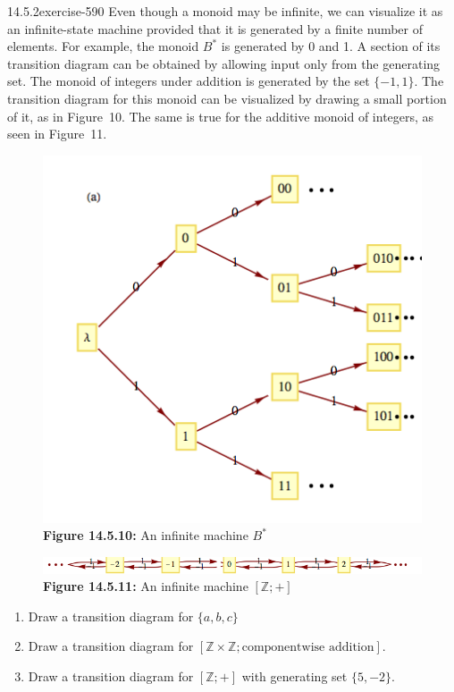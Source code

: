\documentclass[twoside,10pt,]{book}
\numberwithin{equation}{section}
\begin{document}
\begin{divisionsolution}{14.5.2}{}{exercise-590}%
\hypertarget{p-5285}{}%
Even though a monoid may be infinite, we can visualize it as an infinite-state machine provided that it is generated by a finite number of elements. For example, the monoid \(B^*\) is generated by 0 and 1. A section of its transition diagram can be obtained by allowing input only from the generating set. The monoid of integers under addition is generated by the set \(\{-1, 1\}\). The transition diagram for this monoid can be visualized by drawing a small portion of it, as in Figure~10. The same is true for the additive monoid of integers, as seen in Figure~11.%
\begin{figure}
\centering
\includegraphics[width=0.7\linewidth]{images/fig-exercise-14-5-2a.png}
\caption*{\textbf{Figure 14.5.10:} An infinite machine \(B^*\)}
\end{figure}
\begin{figure}
\centering
\includegraphics[width=0.7\linewidth]{images/fig-exercise-14-5-2b.png}
\caption*{\textbf{Figure 14.5.11:} An infinite machine \([\mathbb{Z};+]\)}
\end{figure}
\hypertarget{p-5286}{}%
\leavevmode%
\begin{enumerate}[label=(\alph*)]
\item\hypertarget{li-2391}{}\hypertarget{p-5287}{}%
Draw a transition diagram for \(\{a, b, c\}\)%
\item\hypertarget{li-2392}{}\hypertarget{p-5288}{}%
Draw a transition diagram for \([\mathbb{Z}\times \mathbb{Z};\textrm{componentwise addition}]\).%
\item\hypertarget{li-2393}{}\hypertarget{p-5289}{}%
Draw a transition diagram for \([\mathbb{Z};+]\) with generating set \(\{5,-2\}\).%
\end{enumerate}
%
\end{divisionsolution}%
\end{document}

